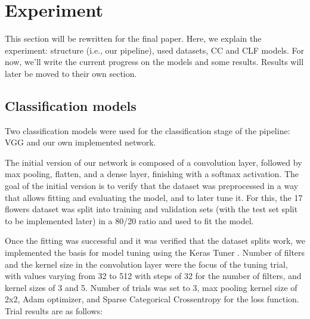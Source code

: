 

\section{Experiment}

This section will be rewritten for the final paper. Here, we explain the experiment: structure (i.e., our pipeline), used datasets, CC and CLF models.
For now, we'll write the current progress on the models and some results. Results will later be moved to their own section.

\subsection{Classification models}

Two classification models were used for the classification stage of the pipeline: VGG and our own implemented network. %


The initial version of our network is composed of a convolution layer, followed by max pooling, flatten, and a dense layer, finishing with a softmax activation.
The goal of the initial version is to verify that the dataset was preprocessed in a way that allows fitting and evaluating the model, and to later tune it.
For this, the 17 flowers dataset was split into training and validation sets (with the test set split to be implemented later) in a 80/20 ratio and used to fit the model.

Once the fitting was successful and it was verified that the dataset splits work, we implemented the basis for model tuning using the Keras Tuner \cite{omalley2019kerastuner}.
Number of filters and the kernel size in the convolution layer were the focus of the tuning trial, with values varying from 32 to 512 with steps of 32 for the number of filters, and kernel sizes of 3 and 5.
Number of trials was set to 3, max pooling kernel size of 2x2, Adam optimizer, and Sparse Categorical Crossentropy for the loss function. Trial results are as follows:

